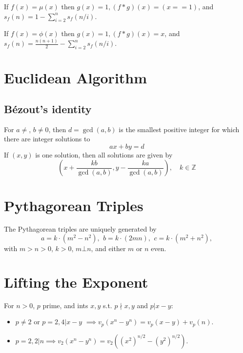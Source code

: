 	
    If $f(x)=\mu(x)$ then $g(x)=1, (f*g)(x)=(x == 1)$, and $s_f(n)=1-\sum_{i=2}^ns_f(n/i)$.

    If $f(x)=\phi(x)$ then $g(x)=1, (f*g)(x)=x$, and $s_f(n)=\frac{n(n+1)}{2}-\sum_{i=2}^ns_f(n/i).$


	\begin{comment}
	Let $s(x)=\sum_{i=1}^x\phi(i).$ Then 
	$$s(n)=\frac{n(n+1)}{2}-\sum_{i=2}^ns\left(\left\lfloor\frac{n}{i}\right\rfloor\right)$$
	can be computed in faster than $\Theta(n)$.
	\end{comment}
	

\section{Euclidean Algorithm}

	\subsection{Bézout's identity}
	For $a \neq $, $b \neq 0$, then $d=\gcd(a,b)$ is the smallest positive integer for which there are integer solutions to
	$$ax+by=d$$
	If $(x,y)$ is one solution, then all solutions are given by
	$$\left(x+\frac{kb}{\gcd(a,b)}, y-\frac{ka}{\gcd(a,b)}\right), \quad k\in\mathbb{Z}$$


	
\section{Pythagorean Triples}
	 The Pythagorean triples are uniquely generated by
	 \[ a=k\cdot (m^{2}-n^{2}),\ \,b=k\cdot (2mn),\ \,c=k\cdot (m^{2}+n^{2}), \]
	 with $m > n > 0$, $k > 0$, $m \bot n$, and either $m$ or $n$ even.

\section{Lifting the Exponent}

For $n>0$, $p$ prime, and ints $x,y$ s.t. $p\nmid x,y$ and $p|x-y$:


\begin{itemize}
\item $p\neq 2$ or $p=2, 4|x-y$ $\implies v_p(x^n - y^n) = v_p(x - y) + v_p(n)$.
\item $p=2, 2|n \implies v_2(x^n-y^n)=v_2((x^2)^{n/2}-(y^2)^{n/2})$.
\end{itemize}
